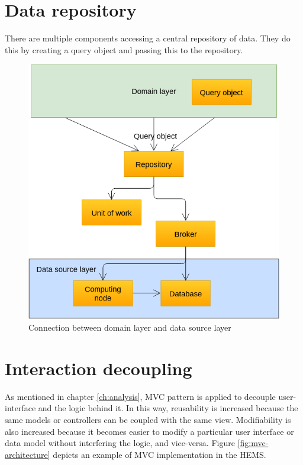 \section{Data repository}

There are multiple components accessing a central repository of data. They do this by creating a query object and passing this to the repository. 

\begin{figure}[H]
\centering
\includegraphics[width=0.8\linewidth]{7-software/images/RepoUowBroker.png}
\caption{Connection between domain layer and data source layer}
\label{fig:frontclasses}
\end{figure}

\section{Interaction decoupling}

As mentioned in chapter \ref{ch:analysis}, MVC pattern is applied to decouple user-interface and the logic behind it. In this way, reusability is increased because the same models or controllers can be coupled with the same view. Modifiability is also increased because it becomes easier to modify a particular user interface or data model without interfering the logic, and vice-versa. Figure \ref{fig:mvc-architecture} depicts an example of MVC implementation in the HEMS.

